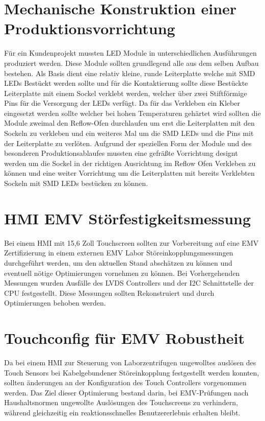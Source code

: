 \documentclass[praktikum,german]{hgbthesis}
\begin{document}
\section{Mechanische Konstruktion einer Produktionsvorrichtung}
Für ein Kundenprojekt mussten LED Module in unterschiedlichen Ausführungen produziert werden. Diese Module sollten grundlegend alle aus dem selben Aufbau bestehen. Als Basis dient eine relativ kleine, runde Leiterplatte welche mit SMD LEDs Bestückt werden sollte und für die Kontaktierung sollte diese Bestückte Leiterplatte mit einem Sockel verklebt werden, welcher über zwei Stiftförmige Pins für die Versorgung der LEDs verfügt. Da für das Verkleben ein Kleber eingesetzt werden sollte welcher bei hohen Temperaturen gehärtet wird sollten die Module zweimal den Reflow-Ofen durchlaufen um erst die Leiterplatten mit den Sockeln zu verkleben und ein weiteres Mal um die SMD LEDs und die Pins mit der Leiterplatte zu verlöten. Aufgrund der speziellen Form der Module und des besonderen Produktionsablaufes mussten eine gefräßte Vorrichtung designt werden um die Sockel in der richtigen Ausrichtung im Reflow Ofen Verkleben zu können und eine weiter Vorrichtung um die Leiterplatten mit bereits Verklebten Sockeln mit SMD LEDs bestücken zu können.

\section{HMI EMV Störfestigkeitsmessung}
Bei einem HMI mit 15,6 Zoll Touchscreen sollten zur Vorbereitung auf eine EMV Zertifizierung in einem externen EMV Labor Störeinkopplungsmessungen durchgeführt werden, um den aktuellen Stand abschätzen zu können und eventuell nötige Optimierungen vornehmen zu können. Bei Vorhergehenden Messungen wurden Ausfälle des LVDS Controllers und der I2C Schnittstelle der CPU festgestellt. Diese Messungen sollten Rekonstruiert und durch Optimierungen behoben werden.

\section{Touchconfig für EMV Robustheit}
Da bei einem HMI zur Steuerung von Laborzentrifugen ungewolltes auslösen des Touch Sensors bei Kabelgebundener Störeinkopplung festgestellt werden konnten, sollten änderungen an der Konfiguration des Touch Controllers vorgenommen werden. Das Ziel dieser Optimierung bestand darin, bei EMV-Prüfungen nach Haushaltsnormen ungewollte Auslösungen des Touchscreens zu verhindern, während gleichzeitig ein reaktionsschnelles Benutzererlebnis erhalten bleibt.
\end{document}
